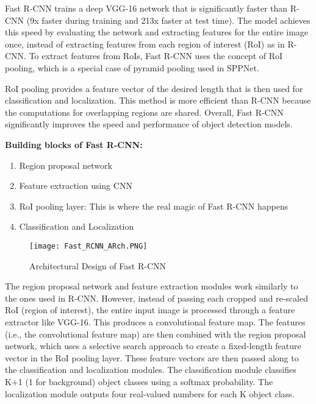 Fast R-CNN trains a deep VGG-16 network that is significantly faster than R-CNN (9x faster during training and 213x faster at test time). The model achieves this speed by evaluating the network and extracting features for the entire image once, instead of extracting features from each region of interest (RoI) as in R-CNN. To extract features from RoIs, Fast R-CNN uses the concept of RoI pooling, which is a special case of pyramid pooling used in SPPNet. 

RoI pooling provides a feature vector of the desired length that is then used for classification and localization. This method is more efficient than R-CNN because the computations for overlapping regions are shared. Overall, Fast R-CNN significantly improves the speed and performance of object detection models.
        

\textbf{Building blocks of Fast R-CNN:}
    \begin{enumerate}
        \item Region proposal network
        \item Feature extraction using CNN
        \item RoI pooling layer: This is where the real magic of Fast R-CNN happens
        \item Classification and Localization
    \end{enumerate}
        
    \begin{figure}[H]
        \centering
        \texttt{[image: Fast\_RCNN\_ARch.PNG]}
        \caption{Architectural Design of Fast R-CNN \cite{girshick2014rich}}
        \label{fig: Fast R-CNN}
    \end{figure}
        
The region proposal network and feature extraction modules work similarly to the ones used in R-CNN. However, instead of passing each cropped and re-scaled RoI (region of interest), the entire input image is processed through a feature extractor like VGG-16. This produces a convolutional feature map. The features (i.e., the convolutional feature map) are then combined with the region proposal network, which uses a selective search approach to create a fixed-length feature vector in the RoI pooling layer. These feature vectors are then passed along to the classification and localization modules. The classification module classifies K+1 (1 for background) object classes using a softmax probability. The localization module outputs four real-valued numbers for each K object class. \cite{girshick2015fast}
